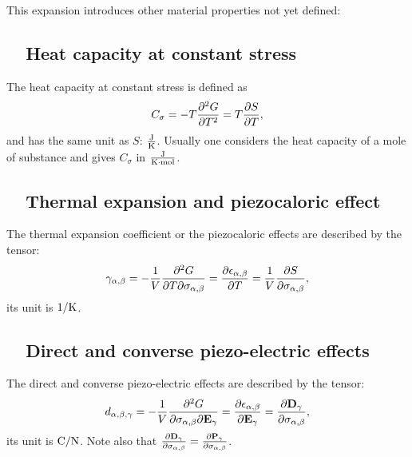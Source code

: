 \documentclass[12pt,a4paper,twoside]{report}
\begin{document}
This expansion introduces other material properties not yet defined:
\subsection{\ \ Heat capacity at constant stress}
The heat capacity at constant stress is defined as
\begin{equation}
C_\sigma= - T {\partial^2 G \over \partial T^2} = 
T {\partial S \over \partial T},
\end{equation}
and has the same unit as $S$: ${\rm J}\over {\rm K}$. Usually one considers the heat
capacity of a mole of substance and gives $C_\sigma$ in 
${{\rm J} \over {\rm K} \cdot {\rm mol}}$.

\subsection{\ \ Thermal expansion and piezocaloric effect}
The thermal expansion coefficient or the piezocaloric effects are
described by the tensor:
\begin{equation}
\gamma_{\alpha,\beta}=-{1\over V} {\partial^2 G \over \partial T 
\partial \sigma_{\alpha,\beta}}={\partial \epsilon_{\alpha,\beta} \over 
\partial T}= {1\over V}
{\partial S \over \partial \sigma_{\alpha,\beta}},
\end{equation}
its unit is $1/{\rm K}$.

\subsection{\ \ Direct and converse piezo-electric effects}
The direct and converse piezo-electric effects are described by the 
tensor:
\begin{equation}
d_{\alpha,\beta,\gamma}=-{1\over V} {\partial^2 G \over
\partial \sigma_{\alpha,\beta} \partial {\bf E}_\gamma}=
{\partial \epsilon_{\alpha,\beta} \over \partial {\bf E}_\gamma}= 
{\partial {\bf D}_\gamma \over \partial \sigma_{\alpha,\beta}},
\end{equation}
its unit is ${\rm C}/{\rm N}$. Note also that 
${\partial {\bf D}_\gamma \over \partial \sigma_{\alpha,\beta}}
={\partial {\bf P}_\gamma \over \partial \sigma_{\alpha,\beta}}$.
\end{document}

